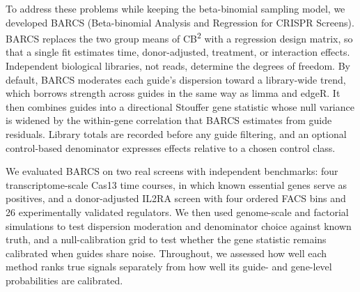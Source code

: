 To address these problems while keeping the beta-binomial sampling model, we
developed BARCS (Beta-binomial Analysis and Regression for CRISPR Screens).
BARCS replaces the two group means of CB\textsuperscript{2} with a regression
design matrix, so that a single fit estimates time, donor-adjusted, treatment,
or interaction effects.  Independent biological libraries, not reads, determine
the degrees of freedom.  By default, BARCS moderates each guide's dispersion
toward a library-wide trend, which borrows strength across guides in the same
way as limma and edgeR.  It then combines guides into a directional Stouffer
gene statistic whose null variance is widened by the within-gene correlation
that BARCS estimates from guide residuals.  Library totals are recorded before
any guide filtering, and an optional control-based denominator expresses
effects relative to a chosen control class.

We evaluated BARCS on two real screens with independent benchmarks: four
transcriptome-scale Cas13 time courses, in which known essential genes serve
as positives, and a donor-adjusted IL2RA screen with four ordered FACS bins and
26 experimentally validated regulators.  We then used genome-scale and
factorial simulations to test dispersion moderation and denominator choice
against known truth, and a null-calibration grid to test whether the gene
statistic remains calibrated when guides share noise.  Throughout, we assessed
how well each method ranks true signals separately from how well its guide-
and gene-level probabilities are calibrated.
